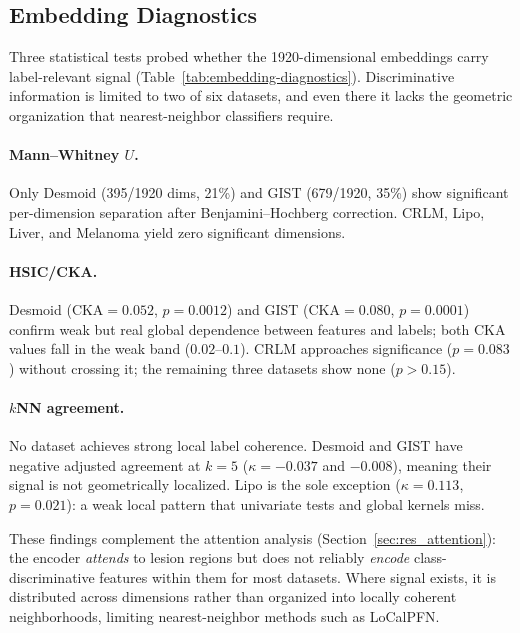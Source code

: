 \subsection{Embedding Diagnostics}\label{sec:res_diagnostics}

Three statistical tests probed whether the 1920-dimensional embeddings
carry label-relevant signal (Table~\ref{tab:embedding-diagnostics}).
Discriminative information is limited to two of six datasets, and even
there it lacks the geometric organization that nearest-neighbor
classifiers require.

\paragraph{Mann--Whitney $U$.}
Only Desmoid (395/1920 dims, 21\%) and GIST (679/1920, 35\%) show
significant per-dimension separation after Benjamini--Hochberg
correction. CRLM, Lipo, Liver, and Melanoma yield zero significant
dimensions.

\paragraph{HSIC/CKA.}
Desmoid ($\text{CKA}{=}0.052$, $p{=}0.0012$) and GIST
($\text{CKA}{=}0.080$, $p{=}0.0001$) confirm weak but real global
dependence between features and labels; both CKA values fall in the
weak band ($0.02$--$0.1$). CRLM approaches significance ($p{=}0.083$)
without crossing it; the remaining three datasets show none ($p{>}0.15$).

\paragraph{$k$NN agreement.}
No dataset achieves strong local label coherence. Desmoid and GIST have
negative adjusted agreement at $k{=}5$ ($\kappa{=}{-}0.037$ and
${-}0.008$), meaning their signal is not geometrically localized. Lipo
is the sole exception ($\kappa{=}0.113$, $p{=}0.021$): a weak local
pattern that univariate tests and global kernels miss.

These findings complement the attention analysis
(Section~\ref{sec:res_attention}): the encoder \emph{attends} to
lesion regions but does not reliably \emph{encode} class-discriminative
features within them for most datasets. Where signal exists, it is
distributed across dimensions rather than organized into locally
coherent neighborhoods, limiting nearest-neighbor methods such as
LoCalPFN.
